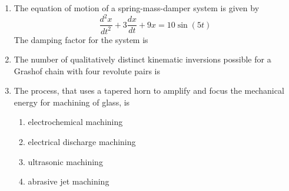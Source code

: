 \documentclass[12pt,onecolumn]{article}
\begin{document}
\begin{enumerate}
    \item The equation of motion of a spring-mass-damper system is given by
          \[ \frac{d^2x}{dt^2} + 3\frac{dx}{dt} + 9x = 10\sin(5t) \]
          The damping factor for the system is
          \begin{enumerate}
          \end{enumerate}

    \item The number of qualitatively distinct kinematic inversions possible for a Grashof chain with four revolute pairs is
          \begin{enumerate}
          \end{enumerate}

    \item The process, that uses a tapered horn to amplify and focus the mechanical energy for machining of glass, is
          \begin{enumerate}
              \item electrochemical machining
              \item electrical discharge machining
              \item ultrasonic machining
              \item abrasive jet machining
          \end{enumerate}


\end{enumerate}
\end{document}
